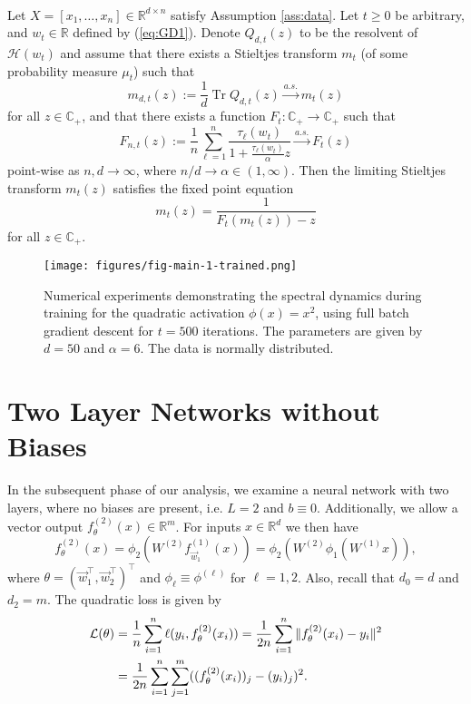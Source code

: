\documentclass{article}
\begin{document}
\bigskip
\\
\begin{theorem} \label{thm:general-mainresult-1}
Let $X=[x_1,\dots,x_n]\in\mathbb{R}^{d\times n}$ satisfy Assumption \ref{ass:data}. Let $t\geq0$ be arbitrary, and $w_t\in\mathbb{R}$ defined by (\ref{eq:GD1}). Denote $Q_{d,t}(z)$ to be the resolvent of $\mathcal{H}(w_t)$ and assume that there exists a Stieltjes transform $m_t$ (of some probability measure $\mu_t$) such that 
$$m_{d,t}(z):=\frac{1}{d}\operatorname{Tr}Q_{d,t}(z)\stackrel{a.s.}{\to}m_t(z)$$
for all $z\in\mathbb{C}_+$, and that there exists a function $F_t:\mathbb{C}_+\to\mathbb{C}_+$ such that
$$F_{n,t}(z):=\frac{1}{n}\sum_{\ell=1}^n \frac{\tau_\ell(w_t)}{1+\frac{\tau_\ell(w_t)}{\alpha}z}\stackrel{a.s.}{\to}F_t(z)$$
point-wise as $n,d\to\infty$, where $n/d\to\alpha\in(1,\infty)$. Then the limiting Stieltjes transform $m_t(z)$ satisfies the fixed point equation
$$m_t(z)=\frac{1}{F_t(m_t(z))-z}$$
for all $z\in\mathbb{C}_+$.
\end{theorem}
\bigskip

\begin{figure}[ht]
    \centering
    \texttt{[image: figures/fig-main-1-trained.png]}
    \caption{Numerical experiments demonstrating the spectral dynamics during training for the quadratic activation $\phi(x)=x^2$, using full batch gradient descent for $t=500$ iterations. The parameters are given by $d=50$ and $\alpha=6$. The data is normally distributed.} \label{fig:dynamic-main}
\end{figure}


\newpage
\section{Two Layer Networks without Biases}\label{sec:two-layer}

In the subsequent phase of our analysis, we examine a neural network with two layers, where no biases are present, i.e. $L=2$ and $b\equiv0$. Additionally, we allow a vector output $f^{(2)}_\theta(x)\in\mathbb{R}^m$. For inputs $x\in\mathbb{R}^d$ we then have
\begin{equation}
f_\theta^{(2)}(x)=\phi_2({W^{(2)}} f_{\vec{w}_1}^{(1)}(x))=\phi_2({W^{(2)}} \phi_1({W^{(1)}} x)),
\end{equation}
where $\theta=(\vec{w}_1^\top,\vec{w}_2^\top)^\top$ and $\phi_\ell\equiv\phi^{(\ell)}$ for $\ell=1,2$. Also, recall that $d_0=d$ and $d_2=m$. The quadratic loss is given by
\begin{align}
\mathcal{L}(\theta) &= \frac{1}{n}\sum_{i=1}^n\ell(y_i,f_\theta^{(2)}(x_i))=\frac{1}{2n}\sum_{i=1}^n\|f_\theta^{(2)}(x_i)-y_i\|^2 \label{eq:loss-2-layer}
\\ &= \frac{1}{2n}\sum_{i=1}^n\sum_{j=1}^m((f_\theta^{(2)}(x_i))_j-(y_i)_j)^2. \notag
\end{align}
\end{document}
